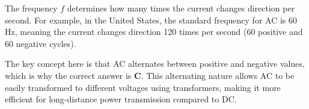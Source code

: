 The frequency \( f \) determines how many times the current changes direction per second. For example, in the United States, the standard frequency for AC is 60 Hz, meaning the current changes direction 120 times per second (60 positive and 60 negative cycles).

The key concept here is that AC alternates between positive and negative values, which is why the correct answer is \textbf{C}. This alternating nature allows AC to be easily transformed to different voltages using transformers, making it more efficient for long-distance power transmission compared to DC.

